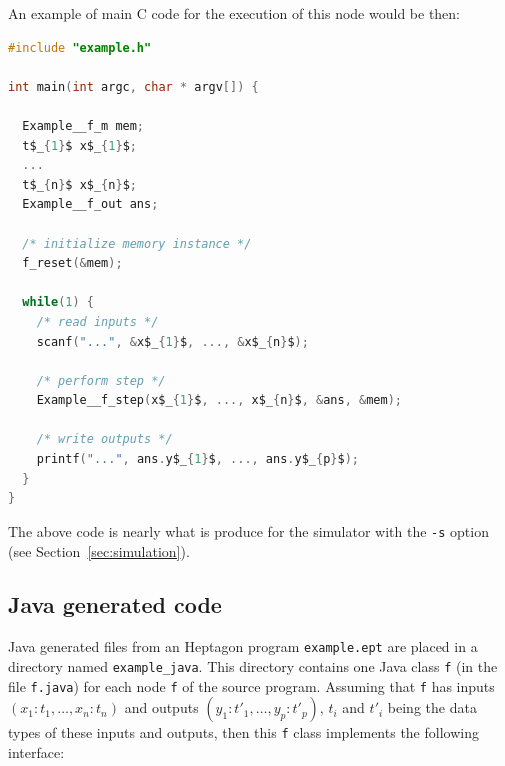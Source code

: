 \documentclass[a4paper]{article}
\begin{document}
An example of main C code for the execution of this node would be then:
\begin{lstlisting}[language=C]
#include "example.h"

int main(int argc, char * argv[]) {
  
  Example__f_m mem;
  t$_{1}$ x$_{1}$;
  ...
  t$_{n}$ x$_{n}$;
  Example__f_out ans;

  /* initialize memory instance */
  f_reset(&mem);
  
  while(1) {
    /* read inputs */
    scanf("...", &x$_{1}$, ..., &x$_{n}$);

    /* perform step */
    Example__f_step(x$_{1}$, ..., x$_{n}$, &ans, &mem);

    /* write outputs */
    printf("...", ans.y$_{1}$, ..., ans.y$_{p}$);
  }
}
\end{lstlisting}

The above code is nearly what is produce for the simulator with the \texttt{-s}
option (see Section~\ref{sec:simulation}).




\subsection{Java generated code}
\label{sec:java-generated-code}

Java generated files from an Heptagon program \texttt{example.ept} are placed in
a directory named \texttt{example\_java}. This directory contains one Java class
\texttt{f} (in the file \texttt{f.java}) for each node \texttt{f} of the source
program. Assuming that \texttt{f} has inputs $(x_1:t_1,\ldots,x_n:t_n)$ and
outputs $(y_1:t'_1,\ldots,y_p:t'_p)$, $t_i$ and $t'_i$ being the data types of
these inputs and outputs, then this \texttt{f} class implements the following
interface:
\end{document}
